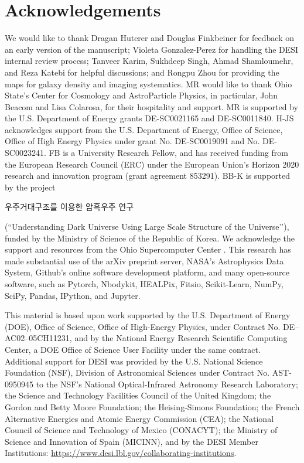 \section*{Acknowledgements}
We would like to thank Dragan Huterer and Douglas Finkbeiner for feedback on an early version of the manuscript; Violeta Gonzalez-Perez for handling the DESI internal review process; Tanveer Karim, Sukhdeep Singh, Ahmad Shamloumehr, and Reza Katebi for helpful discussions; and Rongpu Zhou for  providing the maps for galaxy density and imaging systematics. MR would like to thank Ohio State's Center for Cosmology and AstroParticle Physics, in particular, John Beacom and Lisa Colarosa, for their hospitality and support. MR is supported by the U.S. Department of Energy grants DE-SC0021165 and DE-SC0011840. H-JS acknowledges support from the U.S. Department of Energy, Office of Science, 
Office of High Energy Physics under grant No. DE-SC0019091 and No. DE-SC0023241. FB is a University Research Fellow, and has received funding from the European Research Council (ERC) under the European Union’s Horizon 2020 research and innovation program (grant agreement 853291). BB-K is supported by the project \begin{CJK}{UTF8}{mj}우주거대구조를 이용한 암흑우주 연구\end{CJK} (``Understanding Dark Universe Using Large Scale Structure of the Universe’’), funded by the Ministry of Science of the Republic of Korea. We acknowledge the support and resources from the Ohio Supercomputer Center \citep[OSC;][]{OhioSupercomputerCenter1987}. This research has made substantial use of the arXiv preprint server, NASA’s Astrophysics Data System, Github's online software development platform, and many open-source software, such as Pytorch, Nbodykit, HEALPix, Fitsio, Scikit-Learn, NumPy, SciPy, Pandas, IPython, and Jupyter. 


This material is based upon work supported by the U.S. Department of Energy (DOE), Office of Science, Office of High-Energy Physics, under Contract No. DE–AC02–05CH11231, and by the National Energy Research Scientific Computing Center, a DOE Office of Science User Facility under the same contract. Additional support for DESI was provided by the U.S. National Science Foundation (NSF), Division of Astronomical Sciences under Contract No. AST-0950945 to the NSF's National Optical-Infrared Astronomy Research Laboratory; the Science and Technology Facilities Council of the United Kingdom; the Gordon and Betty Moore Foundation; the Heising-Simons Foundation; the French Alternative Energies and Atomic Energy Commission (CEA); the National Council of Science and Technology of Mexico (CONACYT); the Ministry of Science and Innovation of Spain (MICINN), and by the DESI Member Institutions: \href{https://www.desi.lbl.gov/collaborating-institutions}{https://www.desi.lbl.gov/collaborating-institutions}.

